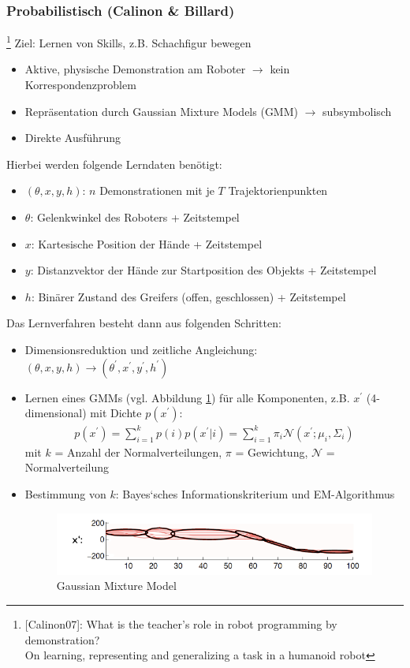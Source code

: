 \subsubsection*{Probabilistisch (Calinon \& Billard)}\footnote{[Calinon07]: What is the teacher’s role in robot programming by demonstration?\\
On learning, representing and generalizing a task in a humanoid robot}
Ziel: Lernen von Skills, z.B. Schachfigur bewegen
\begin{itemize}
\item Aktive, physische Demonstration am Roboter $\rightarrow$ kein Korrespondenzproblem
\item Repräsentation durch Gaussian Mixture Models (GMM) $\rightarrow$ subsymbolisch
\item Direkte Ausführung
\end{itemize}
Hierbei werden folgende Lerndaten benötigt:
\begin{itemize}
\item $(\theta, x, y, h)$: $n$ Demonstrationen mit je $T$ Trajektorienpunkten
\item $\theta$: Gelenkwinkel des Roboters + Zeitstempel
\item $x$: Kartesische Position der Hände + Zeitstempel
\item $y$: Distanzvektor der Hände zur Startposition des Objekts + Zeitstempel
\item $h$: Binärer Zustand des Greifers (offen, geschlossen) + Zeitstempel
\end{itemize}
Das Lernverfahren besteht dann aus folgenden Schritten: 
\begin{itemize}
\item Dimensionsreduktion und zeitliche Angleichung: $(\theta, x, y, h) \rightarrow (\theta^\prime, x^\prime, y^\prime, h^\prime)$
\item Lernen eines GMMs (vgl. Abbildung \ref{fig:ch03_gmm}) für alle Komponenten, z.B. $x^\prime$ (4-dimensional) mit Dichte $p(x^\prime)$:
\begin{align*}
p(x^\prime) = \sum\limits_{i=1}^k p(i)p(x^\prime|i) = \sum\limits_{i=1}^k \pi_i \mathcal{N}(x^\prime; \mu_i, \Sigma_i)
\end{align*} mit $k$ = Anzahl der Normalverteilungen, $\pi$ = Gewichtung, $\mathcal{N}$ = Normalverteilung
\item Bestimmung von $k$: Bayes‘sches Informationskriterium und EM-Algorithmus
\begin{figure}[ht]\centering 
\includegraphics[width=0.6\linewidth]{figures/ch03_gmm.png}
\caption{Gaussian Mixture Model}
\label{fig:ch03_gmm}
\end{figure}
\end{itemize}
